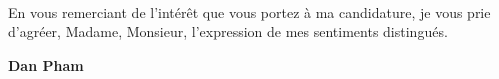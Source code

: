 \documentclass[11pt]{article}
\begin{document}
\paragraph{}
En vous remerciant de l'intérêt que vous portez à ma candidature, je vous prie d’agréer, Madame, Monsieur, l’expression de mes sentiments distingués.\\[3em]
\begin{flushright}
\begin{minipage}[t]{.4\textwidth}
{\bfseries Dan Pham}\\
\end{minipage}\\
\end{flushright}

\vfill%
\end{document}
